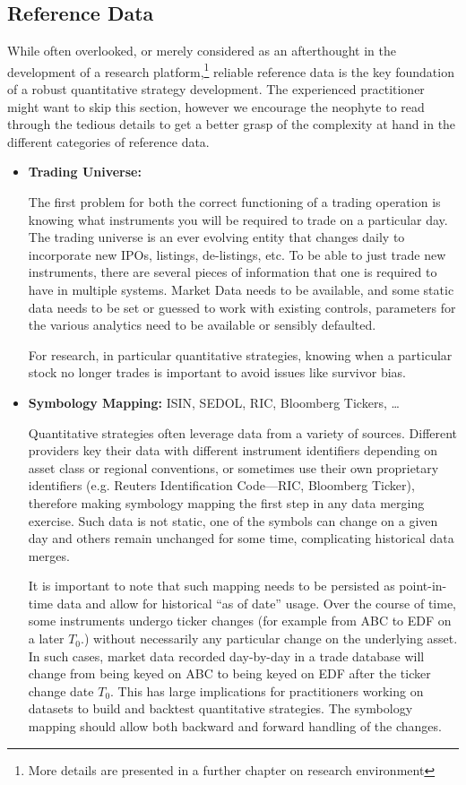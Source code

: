 \subsection{Reference Data} 

While often overlooked, or merely considered as an afterthought in the development of a research platform,\footnote{More details are presented in a further chapter on research environment} reliable reference data is the key foundation of a robust quantitative strategy development. The experienced practitioner might want to skip this section, however we encourage the neophyte to read through the tedious details to get a better grasp of the complexity at hand in the
different categories of reference data.


\begin{itemize}
\item \textbf{Trading Universe:}

The first problem for both the correct functioning of a trading operation is knowing what instruments you will be required to trade on a particular day. The trading universe is an ever evolving entity that changes daily to incorporate new IPOs, listings, de-listings, etc. To be able to just trade new instruments, there are several pieces of information that one is required to have in multiple systems. Market Data needs to be available, and some static data needs to be set or guessed to work with existing controls, parameters for the various analytics need to be available or sensibly defaulted.


For research, in particular quantitative strategies, knowing when a particular stock no longer trades is important to avoid issues like survivor bias.
 
 
\item \textbf{Symbology Mapping:} ISIN, SEDOL, RIC, Bloomberg Tickers, \dots

Quantitative strategies often leverage data from a variety of sources. Different providers key their data with different instrument identifiers depending on asset class or regional conventions, or sometimes use their own proprietary identifiers (e.g. Reuters Identification Code---RIC, Bloomberg Ticker), therefore making symbology mapping the first step in any data merging exercise. Such data is not static, one of the symbols can change on a given day and others remain unchanged for some time, complicating historical data merges.


It is important to note that such mapping needs to be persisted as point-in-time data and allow for historical ``as of date'' usage. Over the course of time, some instruments undergo ticker changes (for example from ABC to EDF on a later $T_0$.) without necessarily any particular change on the underlying asset. In such cases, market data recorded day-by-day in a trade database will change from being keyed on ABC to being keyed on EDF after the ticker change date $T_0$. This has large implications for practitioners working on datasets to build and backtest quantitative strategies. The symbology mapping should allow both backward and forward handling of the changes.



\end{itemize}
